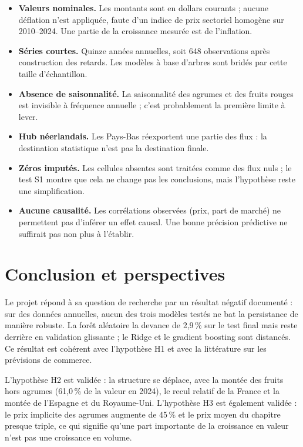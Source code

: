 \documentclass[11pt,a4paper]{article}
\begin{document}
\begin{itemize}[leftmargin=1.2cm]
\item \textbf{Valeurs nominales.} Les montants sont en dollars courants ; aucune
déflation n'est appliquée, faute d'un indice de prix sectoriel homogène sur
2010--2024. Une partie de la croissance mesurée est de l'inflation.
\item \textbf{Séries courtes.} Quinze années annuelles, soit 648 observations
après construction des retards. Les modèles à base d'arbres sont bridés par
cette taille d'échantillon.
\item \textbf{Absence de saisonnalité.} La saisonnalité des agrumes et des
fruits rouges est invisible à fréquence annuelle ; c'est probablement la
première limite à lever.
\item \textbf{Hub néerlandais.} Les Pays-Bas réexportent une partie des flux :
la destination statistique n'est pas la destination finale.
\item \textbf{Zéros imputés.} Les cellules absentes sont traitées comme des flux
nuls ; le test S1 montre que cela ne change pas les conclusions, mais l'hypothèse
reste une simplification.
\item \textbf{Aucune causalité.} Les corrélations observées (prix, part de
marché) ne permettent pas d'inférer un effet causal. Une bonne précision
prédictive ne suffirait pas non plus à l'établir.
\end{itemize}

\section{Conclusion et perspectives}\label{sec:conclusion}

Le projet répond à sa question de recherche par un résultat négatif documenté :
sur des données annuelles, aucun des trois modèles testés ne bat la persistance
de manière robuste. La forêt aléatoire la devance de 2,9\,\% sur le test final
mais reste derrière en validation glissante ; le Ridge et le gradient boosting
sont distancés. Ce résultat est cohérent avec l'hypothèse H1 et avec la
littérature sur les prévisions de commerce.

L'hypothèse H2 est validée : la structure se déplace, avec la montée des fruits
hors agrumes (61,0\,\% de la valeur en 2024), le recul relatif de la France et
la montée de l'Espagne et du Royaume-Uni. L'hypothèse H3 est également validée :
le prix implicite des agrumes augmente de 45\,\% et le prix moyen du chapitre
presque triple, ce qui signifie qu'une part importante de la croissance en
valeur n'est pas une croissance en volume.
\end{document}
